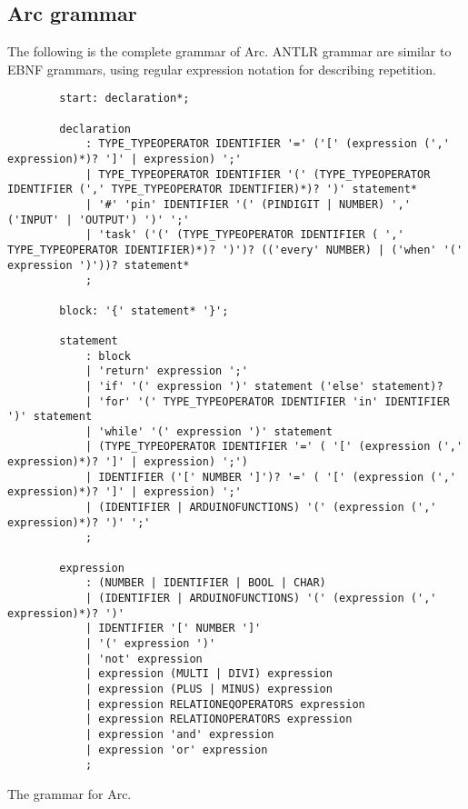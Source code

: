 \subsection{Arc grammar}\label{sec:arcgrammar}
The following is the complete grammar of Arc. ANTLR grammar are similar to EBNF grammars, using regular expression notation for describing repetition.

\begin{listing}[htb!]
    \begin{verbatim}
        start: declaration*;

        declaration
            : TYPE_TYPEOPERATOR IDENTIFIER '=' ('[' (expression (',' expression)*)? ']' | expression) ';'
            | TYPE_TYPEOPERATOR IDENTIFIER '(' (TYPE_TYPEOPERATOR IDENTIFIER (',' TYPE_TYPEOPERATOR IDENTIFIER)*)? ')' statement*
            | '#' 'pin' IDENTIFIER '(' (PINDIGIT | NUMBER) ',' ('INPUT' | 'OUTPUT') ')' ';'
            | 'task' ('(' (TYPE_TYPEOPERATOR IDENTIFIER ( ',' TYPE_TYPEOPERATOR IDENTIFIER)*)? ')')? (('every' NUMBER) | ('when' '(' expression ')'))? statement*
            ;

        block: '{' statement* '}';

        statement
            : block
            | 'return' expression ';'
            | 'if' '(' expression ')' statement ('else' statement)?
            | 'for' '(' TYPE_TYPEOPERATOR IDENTIFIER 'in' IDENTIFIER ')' statement
            | 'while' '(' expression ')' statement
            | (TYPE_TYPEOPERATOR IDENTIFIER '=' ( '[' (expression (',' expression)*)? ']' | expression) ';')
            | IDENTIFIER ('[' NUMBER ']')? '=' ( '[' (expression (',' expression)*)? ']' | expression) ';'
            | (IDENTIFIER | ARDUINOFUNCTIONS) '(' (expression (',' expression)*)? ')' ';'
            ;

        expression
            : (NUMBER | IDENTIFIER | BOOL | CHAR)
            | (IDENTIFIER | ARDUINOFUNCTIONS) '(' (expression (',' expression)*)? ')'
            | IDENTIFIER '[' NUMBER ']'
            | '(' expression ')'
            | 'not' expression
            | expression (MULTI | DIVI) expression
            | expression (PLUS | MINUS) expression
            | expression RELATIONEQOPERATORS expression
            | expression RELATIONOPERATORS expression
            | expression 'and' expression
            | expression 'or' expression
            ;
    \end{verbatim}
    \caption{The grammar for Arc.}
\end{listing}





